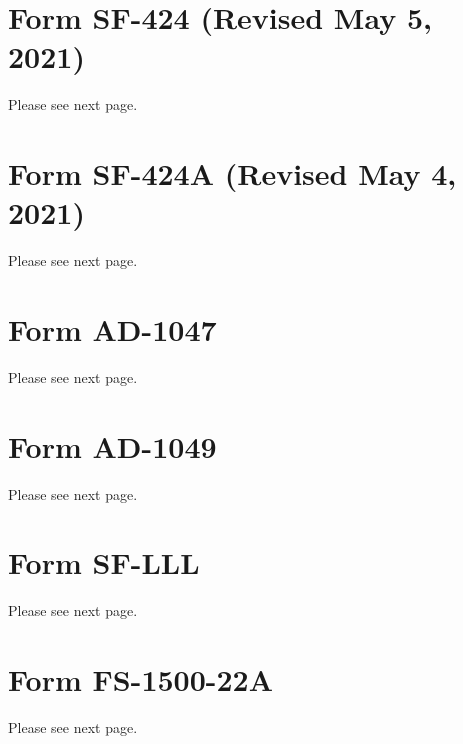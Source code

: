 \documentclass[12pt,letterpaper,english,bibliography=totocnumbered, abstract=on]{scrartcl}
\begin{document}


\newpage{}
\begin{appendices}
	
\section{Form SF-424 (Revised May 5, 2021)}
Please see next page.


\section{Form SF-424A (Revised May 4, 2021)}
Please see next page.


\section{Form AD-1047}
Please see next page.


\section{Form AD-1049}
Please see next page.


\section{Form SF-LLL}
Please see next page.


\section{Form FS-1500-22A}
Please see next page.


\end{appendices}
\end{document}
